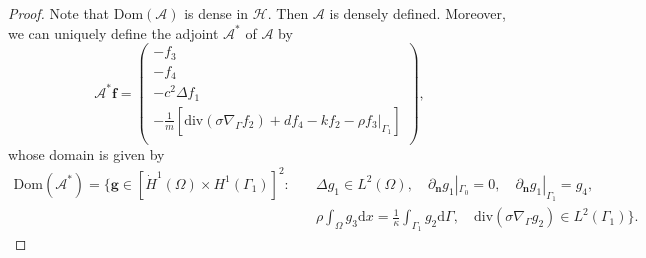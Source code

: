 \documentclass[10pt]{elsarticle}
\begin{document}
\begin{proof}
Note that $\mathrm{Dom}(\mathcal{A})$ is dense in $\mathcal{H}$. Then $\mathcal{A}$ is densely defined. Moreover, we can uniquely define the adjoint $\mathcal{A}^{\ast}$ of $\mathcal{A}$ by
\begin{equation} \label{duality}     
\mathcal{A}^{\ast}\mathbf{ f}=
\left(                 
  \begin{array}{c}   
    -f_3\\  
    -f_4\\  
    -c^2\Delta f_1 \\
     -\frac{1}{m}\left[\mathrm{div}(\sigma\nabla_{\Gamma}f_2) + d f_4-k f_2 -\rho f_3|_{\Gamma_1}\right] \\
  \end{array}
\right),                        
\end{equation}
whose domain is given by
\begin{equation*} 
\begin{split}
	\mathrm{Dom}(\mathcal{A}^{\ast})=\Big\{\mathbf{g}\in [\dot{H}^1(\Omega)\times H^1(\Gamma_1)]^2: & \quad \Delta g_1\in L^2(\Omega), \quad \partial_{\mathbf{n}} g_1|_{\Gamma_0}=0, \quad \partial_{\mathbf{n}} g_1|_{\Gamma_1}=g_4,\\
	&\quad  \rho\int_{\Omega}g_3 \mathrm{d}x = \frac{1}{\kappa}\int_{\Gamma_1}g_2 \mathrm{d}\Gamma, \quad \mathrm{div}(\sigma\nabla_{\Gamma}g_2)\in L^2(\Gamma_1)\Big\}.
\end{split}
\end{equation*}


\end{proof}
\end{document}
